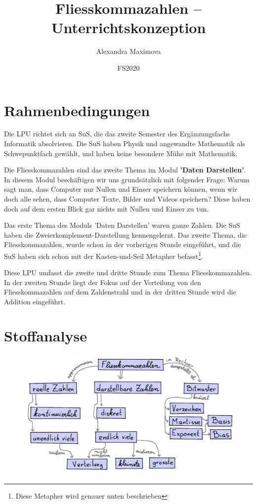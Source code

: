 \documentclass{article}
\title{Fliesskommazahlen -- Unterrichtskonzeption}
\author{Alexandra Maximova}
\date{FS2020}
\begin{document}
\maketitle


\section*{Rahmenbedingungen}
Die LPU richtet sich an SuS, die das zweite Semester des Ergänzungsfachs Informatik absolvieren. Die SuS haben Physik und angewandte Mathematik als Schwepunktfach gewählt, und haben keine besondere Mühe mit Mathematik.

Die Fliesskommazahlen sind das zweite Thema im Modul \textbf{'Daten Darstellen'}. In diesem Modul beschäftigen wir uns grundsätzlich mit folgender Frage: Warum sagt man, dass Computer nur Nullen und Einser speichern können, wenn wir doch alle sehen, dass Computer Texte, Bilder und Videos speichern?  Diese haben doch auf dem ersten Blick gar nichts mit Nullen und Einser zu tun.

Das erste Thema des Moduls 'Daten Darstellen' waren ganze Zahlen. Die SuS haben die Zweierkomplement-Darstellung kennengelernt. Das zweite Thema, die Fliesskommazahlen, wurde schon in der vorherigen Stunde eingeführt, und die SuS haben sich schon mit der Kasten-und-Seil Metapher befasst\footnote{Diese Metapher wird genauer unten beschrieben}.

Diese LPU umfasst die zweite und dritte Stunde zum Thema Fliesskommazahlen. In der zweiten Stunde liegt der Fokus auf der Verteilung von den Fliesskommazahlen auf dem Zahlenstrahl und in der dritten Stunde wird die Addition eingeführt.

\section*{Stoffanalyse}
\begin{figure}[H]
\centering
\includegraphics[width=\textwidth]{Pictures/Fliesskommazahlen_Concept_Map.png} 
\end{figure}
\end{document}
